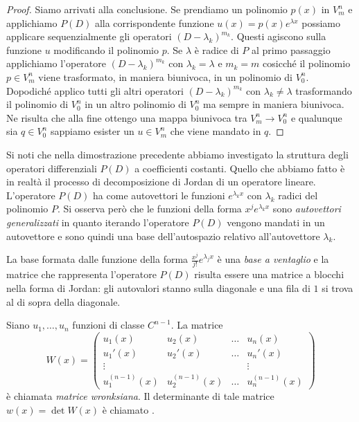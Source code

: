 \begin{proof}
Siamo arrivati alla conclusione. Se prendiamo un polinomio $p(x)$ in $V^n_m$ e applichiamo $P(D)$ alla corrispondente funzione $u(x) =p(x) e^{\lambda x}$
possiamo applicare sequenzialmente gli operatori $(D-\lambda_k)^{m_k}$. Questi agiscono sulla funzione $u$ modificando il polinomio $p$.
Se $\lambda$ è radice di $P$ al primo passaggio applichiamo l'operatore $(D-\lambda_k)^{m_k}$ con $\lambda_k=\lambda$ e $m_k=m$ cosicché il polinomio $p\in V^n_m$ viene trasformato, in maniera biunivoca, in un polinomio di $V^n_0$. Dopodiché applico tutti gli altri operatori $(D-\lambda_k)^{m_k}$ con $\lambda_k \neq \lambda$ trasformando il polinomio di $V^n_0$ in un altro polinomio di $V^n_0$ ma sempre in maniera biunivoca. Ne risulta che alla fine ottengo una mappa biunivoca tra $V^n_m \to V^n_0$ e qualunque sia $q\in V^n_0$ sappiamo esister un $u\in V^n_m$ che viene mandato in $q$.
\end{proof}

\begin{remark}
Si noti che nella dimostrazione precedente abbiamo investigato la
struttura degli operatori differenziali $P(D)$ a coefficienti
costanti. Quello che abbiamo fatto è in realtà il processo di
decomposizione di Jordan di un operatore lineare. L'operatore $P(D)$
ha come autovettori le funzioni $e^{\lambda_k x}$ con $\lambda_k$
radici del polinomio $P$. Si osserva però che le funzioni della forma
$x^j e^{\lambda_k x}$ sono \emph{autovettori generalizzati}
in quanto iterando l'operatore $P(D)$ vengono mandati in un autovettore
e sono quindi una base dell'autospazio relativo all'autovettore
$\lambda_k$.

La base formata dalle funzione della forma $\frac{x^j}{j!} e^{\lambda_j x}$ è
una \emph{base a ventaglio} e la matrice che rappresenta l'operatore
$P(D)$ risulta essere una matrice a blocchi nella forma di Jordan: gli
autovalori stanno sulla diagonale e una fila di $1$ si trova al di sopra della
diagonale.
\end{remark}

\begin{definition}[wronksiano]
Siano $u_1, \dots, u_n$ funzioni di classe $C^{n-1}$.
La matrice
\begin{equation}\label{eq:wronksiano}
  W(x) =
    \begin{pmatrix}
    u_1(x) & u_2(x) & \dots & u_n(x) \\
    u_1'(x) & u_2'(x) & \dots & u_n'(x) \\
    \vdots & & & \vdots\\
    u_1^{(n-1)}(x) & u_2^{(n-1)}(x) & \dots & u_n^{(n-1)}(x)
    \end{pmatrix}
\end{equation}
è chiamata \emph{matrice wronksiana}.
%
%
%
Il determinante di tale matrice
$w(x) = \det W(x)$ è chiamato
.
\end{definition}

